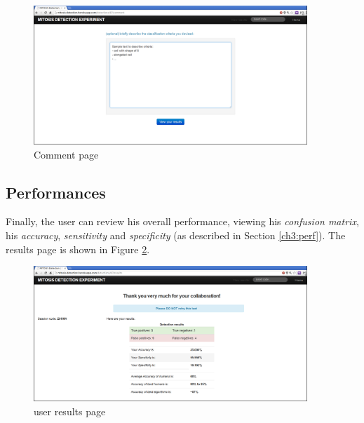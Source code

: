 \begin{figure}[!hbt]
  \centering
	\includegraphics[width=0.92\textwidth]{./images/cr_MD_comments_mod.png}
  \caption{Comment page}
  \label{ch5:fig6_comm}
\end{figure}  


\vspace{0.5cm}

\subsection{Performances}

Finally, the user can review his overall performance, viewing his \textit{confusion matrix}, his \textit{accuracy}, \textit{sensitivity} and \textit{specificity} (as described in Section \ref{ch3:perf}).
The results page is shown in Figure \ref{ch5:fig7_res}.

%       

\begin{figure}[!hbt]
  \centering
	\includegraphics[width=0.92\textwidth]{./images/cr_MD_user_res_mod.png}
  \caption{user results page}
  \label{ch5:fig7_res}
\end{figure}  

